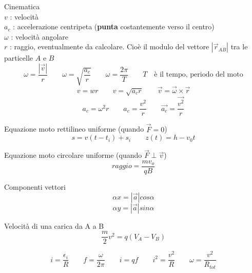 \documentclass[14pt]{extarticle}
\begin{document}
Cinematica\\
$v$ : velocità\\
$a_c$ : accelerazione centripeta (\textbf{punta} costantemente verso il centro)\\
$\omega$ : velocità angolare\\
$r$ : raggio, eventualmente da calcolare. Cioè il modulo del vettore $|\overrightarrow{r}_{AB}|$  tra le particelle $A$ e $B$
\begin{equation*}
    \omega=\frac{\left | \overrightarrow v \right |}{r}
    \quad\quad
    \omega=\sqrt{\frac{a_c}{r}}
    \quad \quad
    \omega=\frac{2\pi}{T}
    \quad\quad T\quad\text{è il tempo, periodo del moto}
\end{equation*}
\begin{equation*}
    v=wr
    \quad\quad
    v=\sqrt{a_cr}
    \quad\quad
    \overrightarrow{v}=\overrightarrow{\omega}\times\overrightarrow{r}
\end{equation*}
\begin{equation*}
    a_c=\omega^2r
    \quad\quad
    a_c=\frac{v^2}{r}
    \quad\quad
    \overrightarrow{a_c}=\frac{\overrightarrow{v^2}}{r}
\end{equation*}


Equazione moto rettilineo uniforme (quando $\overrightarrow{F}=0$)
\begin{equation*}
    s=v(t-t_i)+s_i
    \quad\quad
    z(t)=h-v_0t
\end{equation*}

Equazione moto circolare uniforme (quando $\overrightarrow{F}\perp\overrightarrow{v}$)
\begin{equation*}
    raggio = \frac{mv_o}{qB}
\end{equation*}

Componenti vettori
\begin{equation*}
    \alpha x= \left | \overrightarrow{a} \right |cos\alpha
\end{equation*}
\begin{equation*}
    \alpha y= \left | \overrightarrow{a} \right |sin\alpha
\end{equation*}

Velocità di una carica da A a B
\begin{equation*}
    \frac{m}{2}v^2=q(V_A-V_B)
\end{equation*}

\begin{equation*}
    i=\frac{\epsilon_i}{R}
    \quad\quad
    f=\frac{\omega}{2\pi}
    \quad\quad
    i=qf
    \quad\quad
    i^2=\frac{v^2}{R}
    \quad\quad
    \omega=\frac{v^2}{R_{tot}}
\end{equation*}
\end{document}
